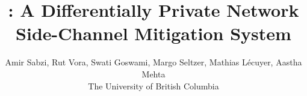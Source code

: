 \newcommand{\parasum}[1]{\smallskip\noindent\hl{#1}}

\newcommand{\todo}[1]{\textcolor{red} {#1}}
\newcommand{\citeme}[1]{\textcolor{red} {[{\bf #1}]}}
\newcommand{\am}[1]{\textcolor{cyan}{\bf AM: #1}}
\newcommand{\ml}[1]{\textcolor{orange}{\bf ML: #1}}
\newcommand{\as}[1]{\textcolor{forestgreen}{\bf AS: #1}}

\newcommand{\update}[1]{{#1}}
\newcommand{\mis}[1]{{#1}}
%


\newenvironment{bashcode}{%
    \VerbatimEnvironment\begin{verbatim}%
    }{%
    \end{verbatim}%
    }











\date{}

\title{\Large \bf \sys: A Differentially Private Network Side-Channel Mitigation
System}

\author{
  Amir Sabzi, Rut Vora, Swati Goswami, Margo Seltzer, Mathias L\'ecuyer, Aastha Mehta\\
  The University of British Columbia}

\maketitle





